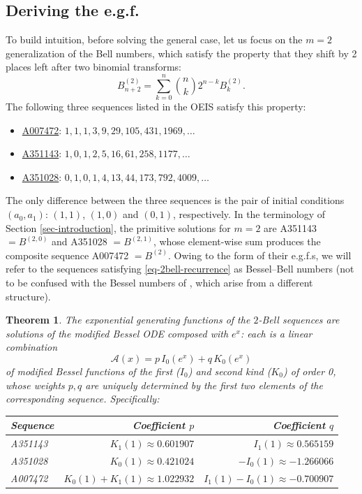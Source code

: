 \documentclass[a4paper]{amsart}
\numberwithin{equation}{section}
\newtheorem{theorem}{Theorem}[section]
\begin{document}
\subsection{Deriving the e.g.f.}
\noindent To build intuition, before solving the general case, let us focus on the $m=2$ generalization of the Bell numbers, which satisfy the property that they shift by 2 places left after two binomial transforms:
%
\begin{equation}\label{eq-2bell-recurrence}
B^{(2)}_{n+2} = \sum_{k=0}^n \binom{n}{k} 2^{n-k} B_k^{(2)}.
\end{equation}
%
The following three sequences listed in the OEIS satisfy this property:
%
\begin{itemize}
    \item \href{https://oeis.org/A007472}{A007472}: $1, 1, 1, 3, 9, 29, 105, 431, 1969, \ldots$
    \item \href{https://oeis.org/A351143}{A351143}: $1, 0, 1, 2, 5, 16, 61, 258, 1177, \ldots$
    \item \href{https://oeis.org/A351028}{A351028}: $0, 1, 0, 1, 4, 13, 44, 173, 792, 4009, \ldots$
\end{itemize}
%
The only difference between the three sequences is the pair of initial conditions $(a_0, a_1)$: $(1, 1)$, $(1,0)$ and $(0,1)$, respectively. In the terminology of Section \ref{sec-introduction}, the primitive solutions for $m=2$ are A351143 $= B^{(2,0)}$ and A351028 $= B^{(2,1)}$, whose element-wise sum produces the composite sequence A007472 $= B^{(2)}$. Owing to the form of their e.g.f.s, we will refer to the sequences satisfying \eqref{eq-2bell-recurrence} as Bessel--Bell numbers (not to be confused with the Bessel numbers of \cite{cheonGeneralizedBesselNumbers2013a}, which arise from a different structure).

\begin{theorem}\label{thm-m2-egf}
The exponential generating functions of the $2$-Bell sequences are solutions of the modified Bessel ODE composed with $e^x$: each is a linear combination
%
\[
\mathcal{A}(x) = p\,I_0(e^x)+q\,K_0(e^x)
\]
%
of modified Bessel functions of the first ($I_0$) and second kind ($K_0$) of order 0, whose weights $p, q$ are uniquely determined by the first two elements of the corresponding sequence. Specifically:

\begin{center}
\begin{tabular}{lrr}
\hline
Sequence & Coefficient \(p\) & Coefficient \(q\) \\
\hline
A351143 & \(K_1(1) \approx 0.601907\) & \(I_1(1) \approx 0.565159\) \\
A351028 & \(K_0(1) \approx 0.421024\) & \(-I_0(1) \approx -1.266066\) \\
A007472 & \(K_0(1) + K_1(1)\approx 1.022932\) & \(I_1(1) - I_0(1)\approx -0.700907\) \\
\hline
\end{tabular}
\end{center}
\smallskip
\end{theorem}
\end{document}
